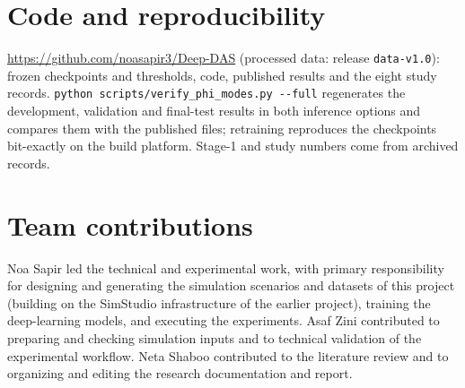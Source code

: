 \documentclass[10pt,a4paper,twocolumn]{article}
\begin{document}
\balance
\section*{Code and reproducibility}
\url{https://github.com/noasapir3/Deep-DAS} (processed data: release \texttt{data-v1.0}): frozen checkpoints and thresholds, code, published results and the eight study records. \texttt{python scripts/verify\_phi\_modes.py -{}-full} regenerates the development, validation and final-test results in both inference options and compares them with the published files; retraining reproduces the checkpoints bit-exactly on the build platform. Stage-1 and study numbers come from archived records.

\section*{Team contributions}
Noa Sapir led the technical and experimental work, with primary responsibility for designing and generating the simulation scenarios and datasets of this project (building on the SimStudio infrastructure of the earlier project), training the deep-learning models, and executing the experiments. Asaf Zini contributed to preparing and checking simulation inputs and to technical validation of the experimental workflow. Neta Shaboo contributed to the literature review and to organizing and editing the research documentation and report.
\end{document}
